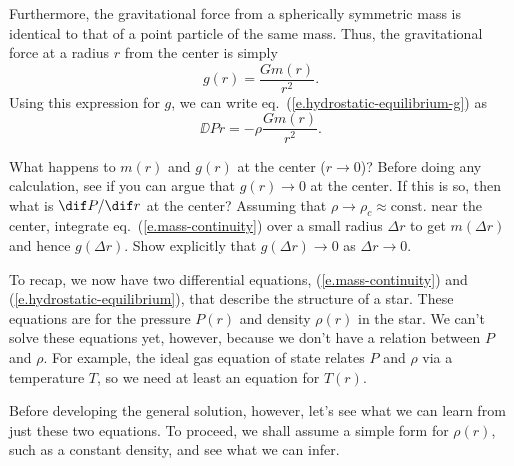 Furthermore, the gravitational force from a spherically symmetric mass is identical to that of a point particle of the same mass. Thus, the gravitational force at a radius $r$ from the center is simply
\[ g(r) = \frac{Gm(r)}{r^{2}}. \]
Using this expression for $g$, we can write eq.~(\ref{e.hydrostatic-equilibrium-g}) as
\begin{equation}\label{e.hydrostatic-equilibrium}
        \DD{P}{r} = -\rho \frac{Gm(r)}{r^{2}}.
\end{equation}

\begin{exercisebox}
What happens to $m(r)$ and $g(r)$ at the center ($r\to0$)? Before doing any calculation, see if you can argue that $g(r)\to0$ at the center. If this is so, then what is $\dif P/\dif r$ at the center? Assuming that $\rho\to\rho_{c}\approx\mathrm{const.}$ near the center, integrate eq.~(\ref{e.mass-continuity}) over a small radius $\Delta r$ to get $m(\Delta r)$ and hence $g(\Delta r)$. Show explicitly that $g(\Delta r)\to 0$ as $\Delta r\to0$.
\end{exercisebox}

To recap, we now have two differential equations, (\ref{e.mass-continuity}) and (\ref{e.hydrostatic-equilibrium}), that describe the structure of a star. These equations are for the pressure $P(r)$ and density $\rho(r)$ in the star. We can't solve these equations yet, however, because we don't have a relation between $P$ and $\rho$. For example, the ideal gas equation of state relates $P$ and $\rho$ via a temperature $T$, so we need at least an equation for $T(r)$. 

Before developing the general solution, however, let's see what we can learn from just these two equations. To proceed, we shall assume a simple form for $\rho(r)$, such as a constant density, and see what we can infer.


